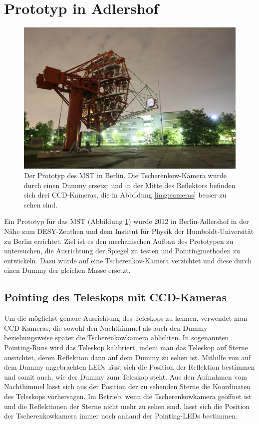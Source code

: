 \section{Prototyp in Adlershof}
\begin{figure}
\centering
\includegraphics[width=\textwidth]{Images/night.png}
\caption{Der Prototyp des MST in Berlin. Die Tscherenkow-Kamera wurde durch einen Dummy ersetzt und in der Mitte des Reflektors befinden sich drei CCD-Kameras, die in Abbildung \ref{img:cameras} besser zu sehen sind.}
\label{img:mst}
\end{figure}
Ein Prototyp für das MST (Abbildung \ref{img:mst}) wurde 2012 in Berlin-Adlershof in der Nähe zum DESY-Zeuthen und dem Institut für Physik der Humboldt-Universität zu Berlin errichtet. Ziel ist es den mechanischen Aufbau des Prototypen zu untersuchen, die Ausrichtung der Spiegel zu testen und Pointingmethoden zu entwickeln. Dazu wurde auf eine Tscherenkov-Kamera verzichtet und diese durch einen Dummy der gleichen Masse ersetzt.

\subsection{Pointing des Teleskops mit CCD-Kameras}
Um die möglichst genaue Ausrichtung des Teleskops zu kennen, verwendet man CCD-Kameras, die sowohl den Nachthimmel als auch den Dummy beziehungsweise später die Tscherenkowkamera ablichten. In sogenannten Pointing-Runs wird das Teleskop kalibriert, indem man das Teleskop auf Sterne ausrichtet, deren Reflektion dann auf dem Dummy zu sehen ist. Mithilfe von auf dem Dummy angebrachten LEDs lässt sich die Position der Reflektion bestimmen und somit auch, wie der Dummy zum Teleskop steht. Aus den Aufnahmen vom Nachthimmel lässt sich aus der Position der zu sehenden Sterne die Koordinaten des Teleskops vorhersagen. Im Betrieb, wenn die Tscherenkowkamera geöffnet ist und die Reflektionen der Sterne nicht mehr zu sehen sind, lässt sich die Position der Tscherenkowkamera immer noch anhand der Pointing-LEDs bestimmen.


